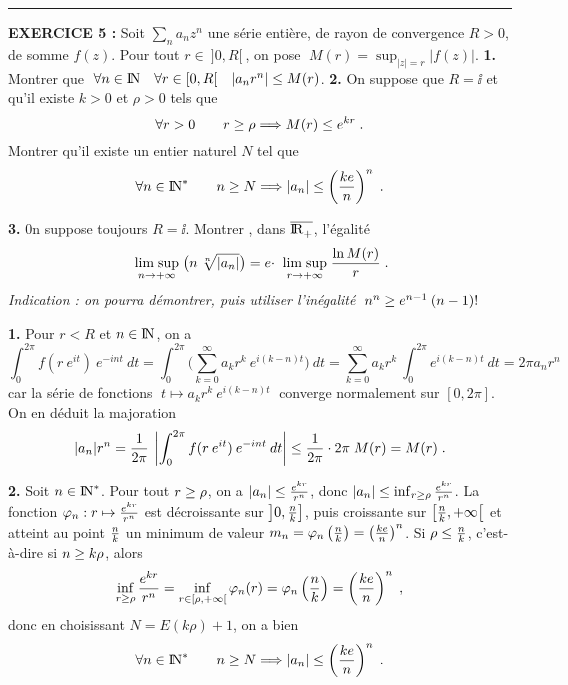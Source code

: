\documentclass{article}
\begin{document}
\bsk
\hrule
\bsk

{\bf EXERCICE 5 :}\msk
Soit $\sum_na_nz^n$ une s\'erie enti\`ere, de rayon de convergence $R>0$, de somme $f(z)$. Pour tout $r\in\>]0,R[\>$, on pose $\;M(r)=\sup_{|z|=r}|f(z)|$.\msk
{\bf 1.} Montrer que $\;\forall n\in{\rm I\kern-0.5mm N}\quad\forall r\in[0,R[\quad|a_nr^n|\leq M(r)$.\msk
{\bf 2.} On suppose que $R=\ii$ et qu'il existe $k>0$ et $\rho>0$ tels que\vv
$$\forall r>0\qquad r\geq\rho\Longrightarrow M(r)\leq e^{kr}\;.$$\sect
Montrer qu'il existe un entier naturel $N$ tel que\vv
$$\forall n\in{\rm I\kern-0.5mm N}^*\qquad n\geq N\Longrightarrow|a_n|\leq\left({ke\over n}\right)^n\;.$$
\par
{\bf 3.} 0n suppose toujours $R=\ii$. Montrer , dans $\overline{{\rm I\kern-0.6mm R}_+^{}}$, l'\'egalit\'e\vv
\def\limsup#1#2{\;\build{\rm lim\;sup}_{{#1}\vers {#2}}^{}}
$$\limsup{n}{\ii}\big(n\>\root n\of{|a_n|}\big)=e\cdot\limsup{r}{\ii}{\ln M(r)\s r}\;.$$
{\it Indication : on pourra d\'emontrer, puis utiliser l'in\'egalit\'e} $\;n^n\geq e^{n-1}\>(n-1)!$

\msk
\cl{- - - - - - - - - - - - - - - - - - - - - - - - - - - - - - -}
\msk

{\bf 1.} Pour $r<R$ et $n\in{\rm I\kern-0.5mm N}$, on a\vv
$$\int_0^{2\pi}f(r\>e^{it})\>e^{-int}\>dt=\int_0^{2\pi}\big(\sum_{k=0}^{\infty}a_kr^k\>e^{i(k-n)t}\big)\>dt=
\sum_{k=0}^{\infty}a_kr^k\>\int_0^{2\pi}e^{i(k-n)t}\>dt=2\pi a_nr^n$$
car la s\'erie de fonctions $\;t\mapsto a_k r^k\>e^{i(k-n)t}\;$ converge normalement sur $[0,2\pi]$. On en d\'eduit la majoration\vv
$$|a_n|r^n={1\over2\pi}\>\left|\int_0^{2\pi}f(r\>e^{it})\>e^{-int}\>dt\right|\leq{1\over2\pi}\cdot2\pi\;M(r)=M(r)\;.$$

{\bf 2.} Soit $n\in{\rm I\kern-0.5mm N}^*$. Pour tout $r\geq\rho$, on a $|a_n|\leq{e^{kr}\over r^n}$, donc $|a_n|\leq\inf_{r\geq\rho}{e^{kr}\over r^n}$. La fonction $\varphi_n:r\mapsto{e^{kr}\over r^n}$ est d\'ecroissante sur $\left]0,{n\over k}\right]$, puis croissante sur $\left[{n\over k},+\infty\right[$ et atteint au point ${n\over k}$ un minimum de valeur $m_n=\varphi_n\left({n\over k}\right)=\left({ke\over n}\right)^n$. Si $\rho\leq{n\over k}$, c'est-\`a-dire si $n\geq k\rho$, alors
$$\inf_{r\geq\rho}{e^{kr}\over r^n}=\inf_{r\in[\rho,+\infty[}\varphi_n(r)=\varphi_n\left({n\over k}\right)=\left({ke\over n}\right)^n\;,$$
donc en choisissant $N=E(k\rho)+1$, on a bien\vv
$$\forall n\in{\rm I\kern-0.5mm N}^*\qquad n\geq N\Longrightarrow|a_n|\leq\left({ke\over n}\right)^n\;.$$
\end{document}
